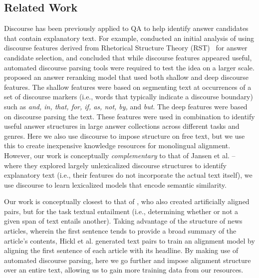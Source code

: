 \subsection{Related Work}
Discourse has been previously applied to QA to help identify answer candidates that contain explanatory text.  For example, \citet{Verberne:2007} conducted an initial analysis of using discourse features derived from Rhetorical Structure Theory (RST)~\citep{mann88} for answer candidate selection, and concluded that while discourse features appeared useful, automated discourse parsing tools were required to test the idea on a larger scale.  
\citet{jansen14} proposed an answer reranking model that used both shallow and deep discourse features.  The shallow features were based on segmenting text at occurrences of a set of discourse markers \citep{marcu97} (i.e., words that typically indicate a discourse boundary) such as \textit{and, in, that, for, if, as, not, by,} and \textit{but}.  The deep features were based on discourse parsing the text.  These features were used in combination to identify useful answer structures in large answer collections across different tasks and genres.  Here we also use discourse to impose structure on free text, but we use this to create inexpensive knowledge resources for monolingual alignment. However, our work is conceptually \textit{complementary} to that of Jansen et al. -- where they explored largely unlexicalized discourse structures to identify explanatory text (i.e., their features do not incorporate the actual text itself), we use discourse to learn lexicalized models that encode semantic similarity.

Our work is conceptually closest to that of \citet{hickl2006recognizing}, who also created artificially aligned pairs, but for the task textual entailment (i.e., determining whether or not a given span of text entails another).  Taking advantage of the structure of news articles, wherein the first sentence tends to provide a broad summary of the article's contents, Hickl et al. generated text pairs to train an alignment model by aligning the first sentence of each article with its headline.  By making use of automated discourse parsing, here we go further and impose alignment structure over an entire text, allowing us to gain more training data from our resources.

